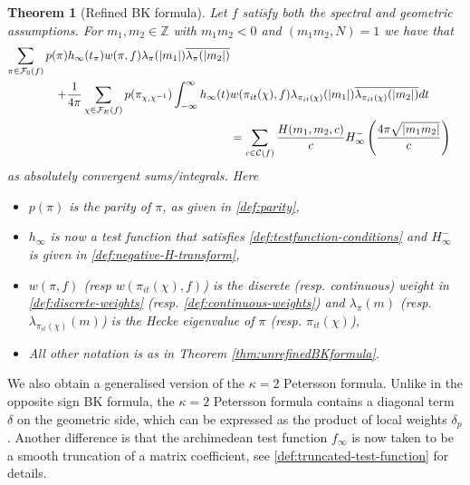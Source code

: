 \documentclass{article}
\newtheorem{theorem}{Theorem}[subsection]
\numberwithin{equation}{section}
\begin{document}
\begin{theorem}[Refined BK formula]\label{thm:refined-opposite-signs}
    Let $f $ satisfy both the spectral and geometric assumptions. For $m_1,m_2 \in \mathbb{Z}$ with $m_1m_2<0$ and $(m_1m_2,N)=1$ we have that
    \begin{align}
     \sum_{\pi \in \mathcal{F}_0(f)}p(\pi)h_\infty(t_\pi)w(\pi,f)\lambda_\pi(|m_1|)\overline{\lambda_\pi(|m_2|)} \notag \\
     +\frac{1}{4\pi}\sum_{\chi \in \mathcal{F}_E(f)}p(\pi_{\chi,\chi^{-1}})\int_{-\infty}^{\infty}h_\infty(t)& w(\pi_{it}(\chi),f)\lambda_{\pi_{it}(\chi)}(|m_1|)\overline{\lambda_{\pi_{it}(\chi)}(|m_2|)}dt \\
    & = \sum_{c\in \mathcal{C}(f)}\frac{H(m_1,m_2,c)}{c}H_\infty^{-}\left(\frac{4\pi\sqrt{|m_1m_2|}}{c}\right) \notag
    \end{align}
    as absolutely convergent sums/integrals. Here
    \begin{itemize}[itemsep=-0.2em]
        \item $p(\pi)$ is the parity of $\pi$, as given in \eqref{def:parity},
        \item $h_\infty$ is now a test function that satisfies \eqref{def:testfunction-conditions} and $H_\infty^-$ is given in \eqref{def:negative-H-transform},
        \item $w(\pi,f)$ (resp $w(\pi_{it}(\chi),f)$) is the discrete (resp. continuous) weight in \eqref{def:discrete-weights} (resp. \eqref{def:continuous-weights}) and $\lambda_\pi(m)$ (resp. $\lambda_{\pi_{it}(\chi)}(m)$) is the Hecke eigenvalue of $\pi$ (resp. $\pi_{it}(\chi)$),
        \item All other notation is as in Theorem \ref{thm:unrefinedBKformula}.
    \end{itemize}
\end{theorem}

We also obtain a generalised version of the $\kappa=2$ Petersson formula. Unlike in the opposite sign BK formula, the $\kappa=2$ Petersson formula contains a diagonal term $\delta$ on the geometric side, which can be expressed as the product of local  weights $\delta_p$. Another difference is that the archimedean test function $f_\infty$ is now taken to be a smooth truncation of a matrix coefficient, see \eqref{def:truncated-test-function} for details.
\end{document}
